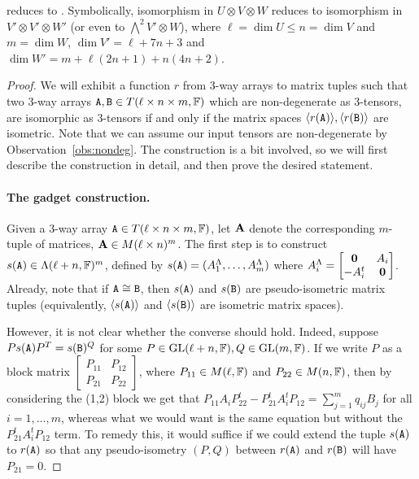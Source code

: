 \documentclass[11pt]{article}
\begin{document}
\begin{proposition} \label{prop:3-tensor_isometry}
\ThreeTIlong reduces to 
\AltMatSpIsomlong. Symbolically, isomorphism in $U \otimes V \otimes W$ reduces to 
isomorphism in $V' \otimes V' \otimes W'$ (or even to $\bigwedge^2 V' \otimes W$), 
where $\ell = \dim U \leq n = \dim V$ and $m = \dim W$, $\dim V' = \ell + 7n + 3$ 
and $\dim W' = m+\ell(2n+1)+n(4n+2)$.
\end{proposition}
\begin{proof}
We will exhibit a function $r$ from 3-way arrays to matrix tuples such that two 
3-way arrays $\mathtt{A},\mathtt{B} \in T(\ell \times n \times m, \mathbb{F})$ which are non-degenerate 
as 3-tensors, are isomorphic as 3-tensors if and only if the matrix spaces 
$\langle r(\mathtt{A}) \rangle, \langle r(\mathtt{B})\rangle $ are isometric. Note that we can 
assume our input tensors are non-degenerate by Observation~\ref{obs:nondeg}.
The construction is a bit involved, so we will first 
describe the construction in detail, and then prove the desired statement. 

\paragraph{The gadget construction.} 
Given a 3-way array $\mathtt{A} \in T(\ell \times n \times m, \mathbb{F})$, let $\mathbf{A}$ denote the corresponding $m$-tuple of matrices, $\mathbf{A} \in M(\ell \times n)^m$. The first step is to construct $s(\mathtt{A}) \in \Lambda(\ell+n, \mathbb{F})^m$, defined by $s(\mathtt{A}) = (A_1^{\Lambda}, \dotsc, A_m^{\Lambda})$ where $A_i^{\Lambda}=\begin{bmatrix} 
\mathbf{0} & A_i \\-A_i^t & \mathbf{0} \end{bmatrix}$. Already, note that if $\mathtt{A} \cong \mathtt{B}$, then $s(\mathtt{A})$ and $s(\mathtt{B})$ are pseudo-isometric matrix tuples (equivalently, $\langle s(\mathtt{A}) \rangle$ and $\langle s(\mathtt{B}) \rangle$ are isometric matrix spaces). 

However, it is not clear whether the converse should hold. 
Indeed, suppose $P s(\mathtt{A}) P^T = s(\mathtt{B})^{Q}$ for some $P \in \mathrm{GL}(\ell + n, \mathbb{F}), Q 
\in \mathrm{GL}(m,\mathbb{F})$. If we write $P$ as a block matrix $\begin{bmatrix} P_{11} & P_{12} 
\\ P_{21} & P_{22} \end{bmatrix}$, where $P_{11} \in M(\ell, \mathbb{F})$ and $P_{22} \in 
M(n,\mathbb{F})$, then by considering the (1,2) block we get that $P_{11} A_i 
P_{22}^t - P_{21}^t A_i^t P_{12} = \sum_{j=1}^m q_{ij} B_j$ for all 
$i=1,\dotsc,m$, whereas what we would want is the same equation but without the $P_{21}^t A_i^t 
P_{12}$ term. 
To remedy this, it would suffice if we could extend the tuple $s(\mathtt{A})$ 
to $r(\mathtt{A})$ so that any pseudo-isometry $(P,Q)$ between $r(\mathtt{A})$ and $r(\mathtt{B})$ will 
have $P_{21} = 0$. 


\end{proof}
\end{document}
